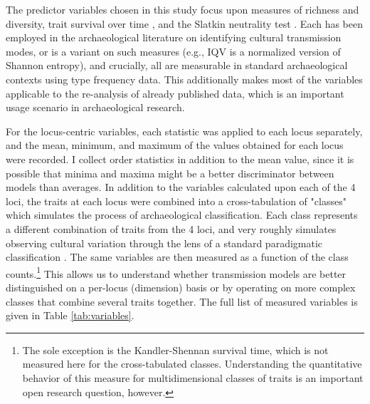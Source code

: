 The predictor variables chosen in this study focus upon measures of richness and
diversity, trait survival over time \cite{kandler2013non}, and the
Slatkin neutrality test \cite{slatkin1996correction, slatkin1994exact}.
Each has been employed in the archaeological literature on identifying
cultural transmission modes, or is a variant on such measures (e.g., IQV
is a normalized version of Shannon entropy), and crucially, all are measurable in standard archaeological contexts using type frequency data.  This additionally makes most of the variables applicable to the re-analysis of already published data, which is an important usage scenario in archaeological research.   

For the locus-centric variables, each statistic was applied to each
locus separately, and the mean, minimum, and maximum of the values
obtained for each locus were recorded. I collect order statistics
in addition to the mean value, since it is possible that minima and
maxima might be a better discriminator between models than averages. In
addition to the variables calculated upon each of the 4 loci, the traits
at each locus were combined into a cross-tabulation of "classes" which simulates the
process of archaeological classification. Each class represents a
different combination of traits from the 4 loci, and very roughly
simulates observing cultural variation through the lens of a standard
paradigmatic classification \cite{Dunnell1971}. The same variables are
then measured as a function of the class counts.\footnote{The sole exception is the Kandler-Shennan survival time, which is not measured here for the cross-tabulated classes.  Understanding the quantitative behavior of this measure for multidimensional classes of traits is an important open research question, however.} This allows us to
understand whether transmission models are better distinguished on a
per-locus (dimension) basis or by operating on more complex classes that
combine several traits together. The full list of measured variables is
given in Table \ref{tab:variables}.

